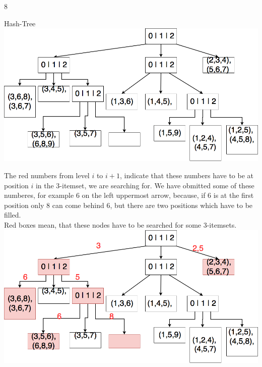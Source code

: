 \documentclass{article}
\begin{document}
\begin{ukon-infie}[10.01.18]{8}
		\begin{exercise}[p=6]{Hash-Tree}
		\question{}
		{
			\includegraphics[scale=0.4]{hash_tree.png}
		}
		
		\question{}
		{
		The red numbers from level $i$ to $i+1$, indicate that these numbers have to be at position $i$ in the 3-itemset, we are searching for. We have obmitted some of these numberes, for example $6$ on the left uppermost arrow, because, if $6$ is at the first position only $8$ can come behind $6$, but there are two positions which have to be filled.\\
		Red boxes mean, that these nodes have to be searched for some 3-itemsets.\\
		\includegraphics[scale=0.4]{hash_tree_search.png}
		}
		\end{exercise}
		
		
\end{ukon-infie}
\end{document}

